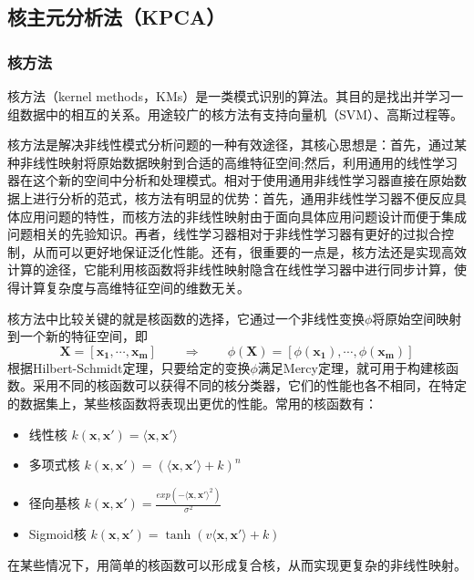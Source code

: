 \documentclass[10pt,a4paper]{article}
\begin{document}
\begin{CJK*}{UTF8}{song}
\subsection{核主元分析法（KPCA）}
\subsubsection{核方法}
核方法（kernel methods，KMs）是一类模式识别的算法。其目的是找出并学习一组数据中的相互的关系。用途较广的核方法有支持向量机（SVM）、高斯过程等。


核方法是解决非线性模式分析问题的一种有效途径，其核心思想是：首先，通过某种非线性映射将原始数据映射到合适的高维特征空间;然后，利用通用的线性学习器在这个新的空间中分析和处理模式。相对于使用通用非线性学习器直接在原始数据上进行分析的范式，核方法有明显的优势：首先，通用非线性学习器不便反应具体应用问题的特性，而核方法的非线性映射由于面向具体应用问题设计而便于集成问题相关的先验知识。再者，线性学习器相对于非线性学习器有更好的过拟合控制，从而可以更好地保证泛化性能。还有，很重要的一点是，核方法还是实现高效计算的途径，它能利用核函数将非线性映射隐含在线性学习器中进行同步计算，使得计算复杂度与高维特征空间的维数无关。


核方法中比较关键的就是核函数的选择，它通过一个非线性变换$\phi$将原始空间映射到一个新的特征空间，即
\begin{equation}
\mathbf{X}=[\boldsymbol{x_1},\cdots,\boldsymbol{x_m}] \qquad
\Longrightarrow \qquad
\phi(\mathbf{X})=[\phi(\boldsymbol{x_1}),\cdots,\phi(\boldsymbol{x_m})]
\end{equation}
根据Hilbert-Schmidt定理，只要给定的变换$\phi$满足Mercy定理\cite{6}，就可用于构建核函数。采用不同的核函数可以获得不同的核分类器，它们的性能也各不相同，在特定的数据集上，某些核函数将表现出更优的性能。常用的核函数有：
\begin{itemize}
\item 线性核	$k(\boldsymbol{x},\boldsymbol{x'})=\langle \boldsymbol{x},\boldsymbol{x'} \rangle$
\item 多项式核	$k(\boldsymbol{x},\boldsymbol{x'})=(\langle \boldsymbol{x},\boldsymbol{x'} \rangle+k)^n$
\item 径向基核	$k(\boldsymbol{x},\boldsymbol{x'})=\frac{exp(-\langle \boldsymbol{x},\boldsymbol{x'} \rangle^2)}{\sigma^2}$
\item Sigmoid核	$k(\boldsymbol{x},\boldsymbol{x'})=\tanh(v\langle \boldsymbol{x},\boldsymbol{x'} \rangle+k)$
\end{itemize}
在某些情况下，用简单的核函数可以形成复合核，从而实现更复杂的非线性映射。


\end{CJK*}
\end{document}
